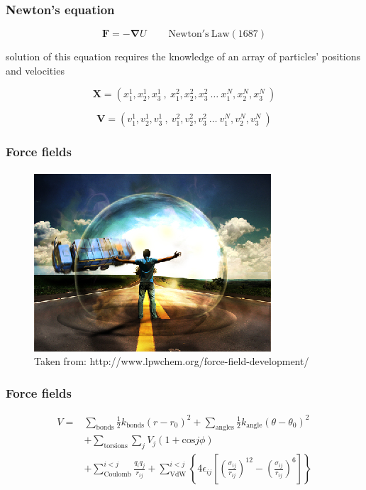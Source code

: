 \documentclass{beamer}
\begin{document}
\begin{frame}
  \frametitle{Newton's equation}
  
  \begin{equation}
	  \mathbf{F}= - \mathbf{\nabla} U      \mathrm{~~~~~~~~~~Newton's~ Law (1687)}
  \end{equation}

  solution of this equation requires the knowledge of an array of
  particles' positions and velocities

  \begin{equation}
          \mathbf{X}= (x^1_1,x^1_2,x^1_3 ~,~ x^2_1,x^2_2,x^2_3 ~\ldots~ x^N_1,x^N_2,x^N_3~)
  \end{equation}


  \begin{equation}
          \mathbf{V}= (v^1_1,v^1_2,v^1_3~,~ v^2_1,v^2_2,v^2_3 ~\ldots~ v^N_1,v^N_2,v^N_3~)
  \end{equation}

\end{frame}


\begin{frame}\frametitle{Force fields}

\begin{figure}
\includegraphics[scale=1.481]{force_field_squarespace.eps}
\caption{{\scriptsize Taken from: http://www.lpwchem.org/force-field-development/}}
\end{figure}

\end{frame}

\begin{frame}\frametitle{Force fields}

\begin{equation}
\begin{aligned}
	V  = & \sum_{\textrm{bonds}} \frac{1}{2} k_{\textrm{bonds}} (r-r_0)^2 + \sum_{\textrm{angles}} \frac{1}{2} k_{\textrm{angle}} 
	(\theta-\theta_0)^2 \\
	&+\sum_{\textrm{torsions}} \sum_j V_j(1+\textrm{cos}j\phi)  \\
 &+ \sum_{\textrm{Coulomb}}^{i<j} \frac{q_i q_j}{r_{ij}}  +  \sum_{\textrm{VdW}}^{i<j} 
\left\{ 4\epsilon_{ij} \left[ \left( \frac{\sigma_{ij}}{r_{ij}} \right)^{12}-  \left( \frac{\sigma_{ij}}{r_{ij}} \right)^{6} \right]  \right\}
\end{aligned}
\end{equation}


\end{frame}
\end{document}
